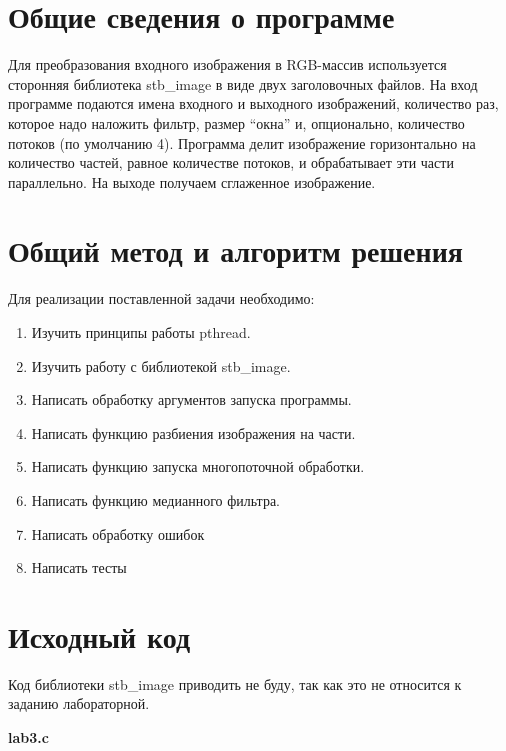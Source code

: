 \section{Общие сведения о программе}

Для преобразования входного изображения в RGB-массив используется сторонняя библиотека stb\_image в виде двух заголовочных файлов. На вход программе подаются имена входного и выходного изображений, количество раз, которое надо наложить фильтр, размер \enquote{окна} и, опционально, количество потоков (по умолчанию 4). Программа делит изображение горизонтально на количество частей, равное количестве потоков, и обрабатывает эти части параллельно. На выходе получаем сглаженное изображение.

\pagebreak

\section{Общий метод и алгоритм решения}

Для реализации поставленной задачи необходимо:

\begin{enumerate}
    \item Изучить принципы работы pthread.
    \item Изучить работу с библиотекой stb\_image.
    \item Написать обработку аргументов запуска программы.
    \item Написать функцию разбиения изображения на части.
    \item Написать функцию запуска многопоточной обработки.
    \item Написать функцию медианного фильтра.
    \item Написать обработку ошибок
    \item Написать тесты
\end{enumerate}

\pagebreak

\section{Исходный код}

Код библиотеки stb\_image приводить не буду, так как это не относится к заданию лабораторной.

\textbf{lab3.c}

